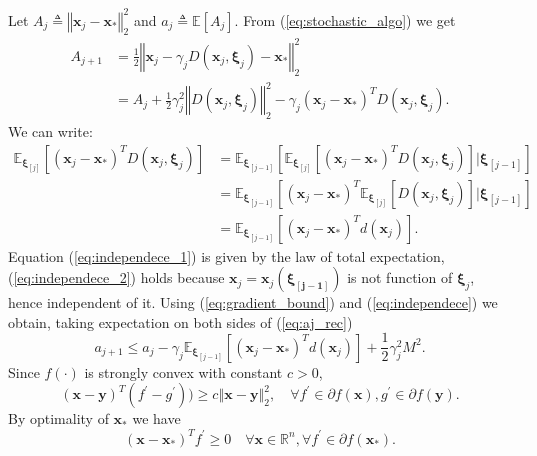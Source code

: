 \documentclass{article}
\renewcommand{\vec}[1]{\boldsymbol{#1}}
\newcommand{\norm}[1]{\left\Vert #1 \right\Vert}
\newcommand{\defeq}{\triangleq}
\begin{document}
Let $A_j\defeq \norm{\vec{x}_j-\vec{x}_*}^2_2$ and $a_j\defeq\mathbb{E}[A_j]$.
From (\ref*{eq:stochastic_algo}) we get
\begin{equation}
\begin{aligned}
	A_{j+1} &= \frac{1}{2}\norm{\vec{x}_j - \gamma_jD(\vec{x}_j,\vec{\xi}_j) -\vec{x}_*}^2_2\\ 
	&= A_j +\frac{1}{2}\gamma_j^2\norm{D(\vec{x}_j,\vec{\xi}_j)}^2_2 - \gamma_j(\vec{x}_j-\vec{x}_*)^TD(\vec{x}_j,\vec{\xi}_j).
\end{aligned}
\label{eq:aj_rec}
\end{equation}
We can write:
\begin{align}
	\mathbb{E}_{\vec{\xi}_{[j]}}[(\vec{x}_j-\vec{x}_*)^TD(\vec{x}_j,\vec{\xi}_j)] &= \mathbb{E}_{\vec{\xi}_{[j-1]}}[\mathbb{E}_{\vec{\xi}_{[j]}}[(\vec{x}_j-\vec{x}_*)^TD(\vec{x}_j,\vec{\xi}_j)]|\vec{\xi}_{[j-1]}] \label{eq:independece_1}\\ 
	&= \mathbb{E}_{\vec{\xi}_{[j-1]}}[(\vec{x}_j-\vec{x}_*)^T\mathbb{E}_{\vec{\xi}_{[j]}}[D(\vec{x}_j,\vec{\xi}_j)]|\vec{\xi}_{[j-1]}]\label{eq:independece_2} \\ 	
	&=\mathbb{E}_{\vec{\xi}_{[j-1]}}[(\vec{x}_j-\vec{x}_*)^Td(\vec{x}_j)].	\label{eq:independece}
\end{align}
Equation (\ref{eq:independece_1}) is given by the law of total expectation, (\ref{eq:independece_2}) holds because $\vec{x}_j = \vec{x}_j(\vec{\xi_{[j-1]}})$ is not function of $\vec{\xi}_j$, hence independent of it.
Using (\ref{eq:gradient_bound}) and (\ref{eq:independece}) we obtain, taking expectation on both sides of (\ref{eq:aj_rec})
\begin{equation}
	a_{j+1} \leq a_j - \gamma_j\mathbb{E}_{\vec{\xi}_{[j-1]}}[(\vec{x}_j-\vec{x}_*)^Td(\vec{x}_j)] + \frac{1}{2}\gamma_j^2M^2.
	\label{eq:aj_rec_2}
\end{equation}
Since $f(\cdot)$ is strongly convex with constant $c>0$,
\begin{equation}
	(\vec{x}-\vec{y})^T(f^\prime- g^\prime))\geq c \norm{\vec{x}-\vec{y}}^2_2, \quad \forall f^\prime\in\partial f(\vec{x}), g^\prime\in\partial f(\vec{y}).
	\label{eq:strong_convexity}
\end{equation}
By optimality of $\vec{x}_*$ we have
\begin{equation}
	(\vec{x}-\vec{x}_*)^T f^\prime \geq 0 \quad \forall \vec{x} \in \mathbb{R}^n, \forall f^\prime\in\partial f(\vec{x}_*).
	\label{eq:optimality}
\end{equation}
\end{document}
